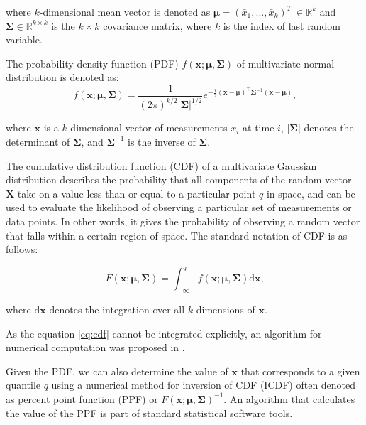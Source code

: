 where $k$-dimensional mean vector is denoted as \(\boldsymbol\mu = (\bar x_{1},...,\bar x_{k})^T\ \in \mathbb{R}^{k}\) and \(\boldsymbol\Sigma \in \mathbb{R}^{k\times{k}}\) is the $k \times k$ covariance matrix, where \(k\) is the index of last random variable.

The probability density function (PDF) \(f(\boldsymbol{x}; \boldsymbol{\mu}, \boldsymbol{\Sigma})\) of multivariate normal distribution is denoted as:
\begin{equation}
  f(\boldsymbol{x}; \boldsymbol{\mu}, \boldsymbol{\Sigma}) = \frac{1}{(2\pi)^{k/2} |\boldsymbol{\Sigma}|^{1/2}} e^{-\frac{1}{2} (\boldsymbol{x}-\boldsymbol{\mu})^\top \boldsymbol{\Sigma}^{-1} (\boldsymbol{x}-\boldsymbol{\mu})}\text{,}
\end{equation}

where $\boldsymbol{x}$ is a $k$-dimensional vector of measurements $x_i$ at time $i$, $|\boldsymbol{\Sigma}|$ denotes the determinant of $\boldsymbol{\Sigma}$, and $\boldsymbol{\Sigma}^{-1}$ is the inverse of $\boldsymbol{\Sigma}$.

The cumulative distribution function (CDF) of a multivariate Gaussian distribution describes the probability that all components of the random vector \(\boldsymbol{X}\) take on a value less than or equal to a particular point \(q\) in space, and can be used to evaluate the likelihood of observing a particular set of measurements or data points. In other words, it gives the probability of observing a random vector that falls within a certain region of space. The standard notation of CDF is as follows:

\begin{equation}
  F(\boldsymbol{x}; \boldsymbol{\mu}, \boldsymbol{\Sigma}) = \int_{-\infty}^{q} f(\boldsymbol{x}; \boldsymbol{\mu}, \boldsymbol{\Sigma}) \text{d}\boldsymbol{x}\text{,}\label{eq:cdf}
\end{equation}

where $\text{d}\boldsymbol{x}$ denotes the integration over all $k$ dimensions of $\boldsymbol{x}$.

As the equation \eqref{eq:cdf} cannot be integrated explicitly, an algorithm for numerical computation was proposed in \citet{Genz2000}.

Given the PDF, we can also determine the value of \(\boldsymbol{x}\) that corresponds to a given quantile $q$ using a numerical method for inversion of CDF (ICDF) often denoted as percent point function (PPF) or $F(\boldsymbol{x}; \boldsymbol{\mu}, \boldsymbol{\Sigma})^{-1}$. An algorithm that calculates the value of the PPF is part of standard statistical software tools.

